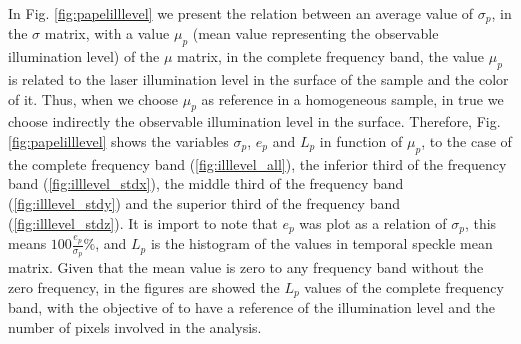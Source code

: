 \documentclass[review]{elsarticle}
\begin{document}
In Fig. \ref{fig:papelilllevel} we present the relation between an average value of $\sigma_p$,
in the $\sigma$ matrix, with a value $\mu_p$ (mean value representing the observable illumination level) of the $\mu$ matrix, 
in the complete frequency band, the value $\mu_p$
is related to the laser illumination level in the surface of the sample \cite{Nothdurft:05}
and the color of it. Thus, when we choose $\mu_p$  as reference 
in a homogeneous sample,  
in true we choose indirectly the observable illumination level in the surface.
Therefore, Fig. \ref{fig:papelilllevel} shows the variables $\sigma_p$, $e_p$ and $L_p$ in function
of  $\mu_p$, to the case of the complete frequency band (\ref{fig:illlevel_all}), the inferior third of the frequency band (\ref{fig:illlevel_stdx}),
the middle third of the frequency band (\ref{fig:illlevel_stdy}) and the superior third of the frequency band (\ref{fig:illlevel_stdz}). It is import to note that $e_p$ was plot as a relation of $\sigma_p$, this means  $100 \frac{e_p}{\sigma_p} \%$,
and $L_p$ is the histogram of the values in temporal speckle mean matrix.
Given that the mean value is zero to any frequency band without the zero frequency,
in the figures are showed the $L_p$ values of the complete frequency band, 
with the objective of to have a reference of the illumination level and the number of pixels involved in the analysis.
\end{document}
